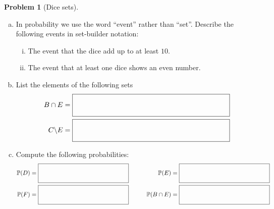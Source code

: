 \documentclass[10pt]{amsart}
\theoremstyle{definition}
\newtheorem{problem}{Problem}
\newcommand{\inlineanswerbox}[1][3in]{%
  \ensuremath{%
    \vcenter{\hbox{%
        \fbox{\rule{0pt}{0.35in}\hspace{#1}}%
      }}%
  }%
}
\begin{document}
\begin{problem}[Dice sets]
\begin{enumerate}[(a)]
    \item In probability we use the word ``event'' rather than ``set''.
    Describe the following events in set-builder notation:
    \begin{enumerate}[(i)]
      \item The event that the dice add up to at least $10$.
      \vspace{.8in}
      \item The event that at least one dice shows an even number.
      \vspace{.8in}
    \end{enumerate}


    \item List the elements of the following sets
    \begin{align*}
      B\cap E &= \inlineanswerbox\\
      C\backslash E &= \inlineanswerbox
    \end{align*}
    \item Compute the following probabilities:
    \begin{alignat*}{2}
      \mathbb P(D) &={}\inlineanswerbox[2in] &\qquad \mathbb P(E) &={}\inlineanswerbox[2in] \\
      \mathbb P(F) &={}\inlineanswerbox[2in] &\qquad \mathbb P(B\cap E) &={}\inlineanswerbox[2in]
    \end{alignat*}
  \end{enumerate}
\end{problem}
\end{document}

